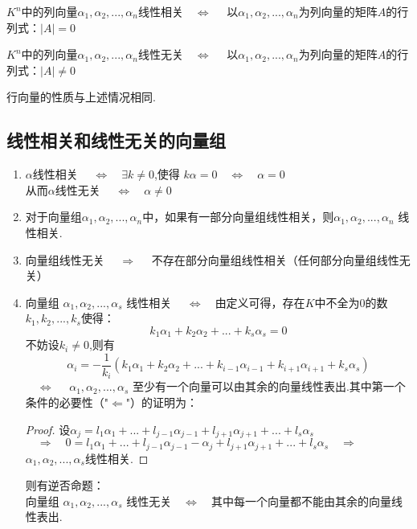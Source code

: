 \documentclass[blue,normal,cn]{elegantnote}
\begin{document}
\begin{theorem}
$K^n$中的列向量$α_1,α_2,...,α_n$线性相关$\quad \Longleftrightarrow \quad $ 以$α_1,α_2,...,α_n$为列向量的矩阵$A$的行列式：$|A|=0$

$K^n$中的列向量$α_1,α_2,...,α_n$线性无关$\quad \Longleftrightarrow \quad $ 以$α_1,α_2,...,α_n$为列向量的矩阵$A$的行列式：$|A|≠ 0$

行向量的性质与上述情况相同.

\subsection{线性相关和线性无关的向量组}
\begin{enumerate}[(1)]
    \item $α$线性相关 $\quad \Longleftrightarrow \quad \exists k≠0$,使得 $kα=0 \quad \Longleftrightarrow \quad α=0$\\从而$α$线性无关  $\quad \Longleftrightarrow \quad  α ≠ 0$
    \item 对于向量组$α_1,α_2,...,α_n$中，如果有一部分向量组线性相关，则$α_1,α_2,...,α_n$ 线性相关.
    \item 向量组线性无关   $\quad \Longrightarrow \quad$ 不存在部分向量组线性相关（任何部分向量组线性无关）
    \item 向量组 $α_1,α_2,...,α_s$ 线性相关 $\quad \Longleftrightarrow \quad$由定义可得，存在$K$中不全为$0$的数$k_1,k_2,...,k_s$使得：
        \begin{equation*}
            k_1α_1+k_2α_2+...+k_sα_s=0
        \end{equation*}
        不妨设$k_i≠ 0$,则有
        \begin{equation*}
            α_i=-\frac{1}{k_i}(k_1α_1+k_2α_2+...+k_{i-1}α_{i-1}+k_{i+1}α_{i+1}+k_sα_s)
        \end{equation*}
        $\quad \Longleftrightarrow \quad$ $α_1,α_2,...,α_s$ 至少有一个向量可以由其余的向量线性表出.其中第一个条件的必要性（"$\Leftarrow$"）的证明为：
        \begin{proof}
            设$α_j=l_1α_1+...+l_{j-1} α_{j-1}+l_{j+1} α_{j+1}+...+l_s α_s$\\
            $\quad \Longrightarrow \quad 0=l_1α_1+...+l_{j-1} α_{j-1}-α_j+l_{j+1} α_{j+1}+...+l_s α_s   \quad \Longrightarrow \quad $
            $α_1,α_2,...,α_s$线性相关.
        \end{proof}
        则有逆否命题：
        \\向量组 $α_1,α_2,...,α_s$ 线性无关$\quad \Longleftrightarrow \quad$其中每一个向量都不能由其余的向量线性表出.
\end{enumerate}



\end{theorem}
\end{document}
